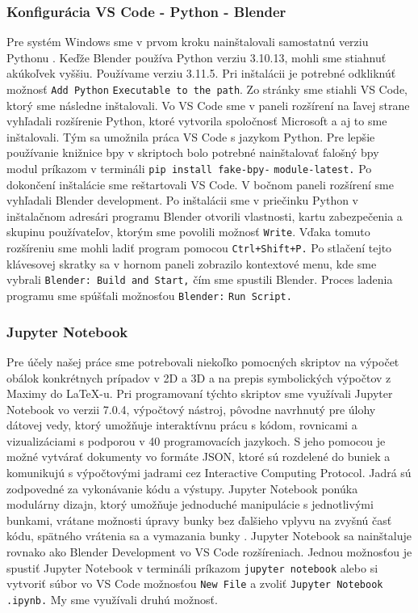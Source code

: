 \subsubsection{Konfigurácia VS Code - Python - Blender}
Pre systém Windows sme v prvom kroku nainštalovali samostatnú verziu Pythonu \cite{PythonDownload}. Keďže Blender používa Python verziu 3.10.13, mohli sme stiahnuť akúkoľvek vyššiu. Používame verziu 3.11.5. Pri inštalácii je potrebné odkliknúť možnosť \verb|Add Python| \verb|Executable to the path|. Zo stránky \cite{VSCode} sme stiahli VS Code, ktorý sme následne inštalovali. Vo VS Code sme v paneli rozšírení na ľavej strane vyhľadali rozšírenie Python, ktoré vytvorila spoločnosť Microsoft a aj to sme inštalovali. Tým sa umožnila práca VS Code s jazykom Python. Pre lepšie používanie knižnice bpy v skriptoch bolo potrebné nainštalovať falošný bpy modul \cite{Fake-bpy-module} príkazom v termináli \verb|pip install fake-bpy-| \verb|module-latest.|
Po dokončení inštalácie sme reštartovali VS Code. V bočnom paneli rozšírení sme vyhľadali Blender development. Po inštalácii sme v priečinku Python v inštalačnom adresári programu Blender otvorili vlastnosti, kartu zabezpečenia a skupinu používateľov, ktorým sme povolili možnosť \verb|Write|. Vďaka tomuto rozšíreniu sme mohli ladiť program pomocou \verb|Ctrl+Shift+P.| Po stlačení tejto klávesovej skratky sa v hornom paneli zobrazilo kontextové menu, kde sme vybrali \verb|Blender: Build and Start,| čím sme spustili Blender. Proces ladenia programu sme spúšťali možnosťou \verb|Blender:| \verb|Run Script.|
\subsubsection{Jupyter Notebook}
Pre účely našej práce sme potrebovali niekoľko pomocných skriptov na výpočet obálok konkrétnych prípadov v 2D a 3D a na prepis symbolických výpočtov z Maximy do \LaTeX-u. Pri programovaní týchto skriptov sme využívali Jupyter Notebook vo verzii 7.0.4, výpočtový nástroj, pôvodne navrhnutý pre úlohy dátovej vedy, ktorý umožňuje interaktívnu prácu s kódom, rovnicami a vizualizáciami s podporou v 40 programovacích jazykoch. S jeho pomocou je možné vytvárať dokumenty vo formáte JSON, ktoré sú rozdelené do buniek a komunikujú s výpočtovými jadrami cez Interactive Computing Protocol. Jadrá sú zodpovedné za vykonávanie kódu a výstupy. Jupyter Notebook ponúka modulárny dizajn, ktorý umožňuje jednoduché manipulácie s jednotlivými bunkami, vrátane možnosti úpravy bunky bez ďalšieho vplyvu na zvyšnú časť kódu, spätného vrátenia sa a vymazania bunky \cite{Jupyter}. Jupyter Notebook sa nainštaluje rovnako ako Blender Development vo VS Code rozšíreniach. 
Jednou možnosťou je spustiť Jupyter Notebook v termináli príkazom \verb|jupyter notebook| alebo si vytvoriť súbor vo VS Code možnosťou \verb|New File| a zvoliť \verb|Jupyter Notebook .ipynb.| My sme využívali druhú možnosť.

